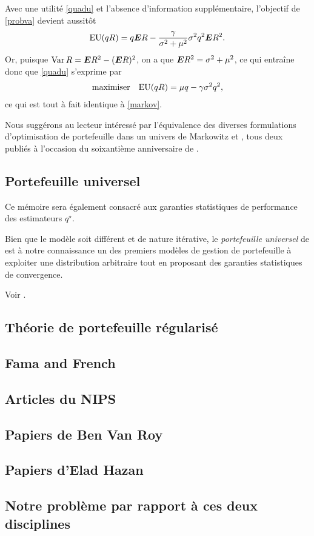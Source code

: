Avec une utilité \eqref{quadu} et l'absence d'information supplémentaire, l'objectif de
\eqref{probva} devient aussitôt
\begin{equation}
  \label{euquad}
  \operatorname{\bm{EU}}(qR) = q \bm E R - \frac{\gamma}{\sigma^2+\mu^2}\sigma^2 q^2\bm E R^2.
\end{equation}
Or, puisque $\operatorname{\bm{Var}} R = \bm E  R^2 - (\bm E R)^2$, on a que $\bm E R^2 = \sigma^2 + \mu^2$, ce qui entraîne
donc que \eqref{quadu} s'exprime par
\begin{equation}
  \begin{array}{ll}\operatorname*{maximiser} & \displaystyle{\operatorname{\bm{EU}}(qR) = \mu q - \gamma\sigma^2 q^2,}\end{array}
\end{equation}
ce qui est tout à fait identique à \eqref{markov}.

Nous suggérons au lecteur intéressé par l'équivalence des diverses formulations
d'optimi\-sation de portefeuille dans un univers de Markowitz \cite{bodnar2013equivalence}
et \cite{markowitz2014mean}, tous deux publiés à l'occasion du soixantième anniversaire de
\cite{markowitz1952portfolio}.

\subsection{Portefeuille universel}

Ce mémoire sera également consacré aux garanties statistiques de performance des
estimateurs $q^\star$.

Bien que le modèle soit différent et de nature itérative, le \textit{portefeuille
  universel} de \cite{cover1991universal} est à notre connaissance un des premiers modèles
de gestion de portefeuille à exploiter une distribution arbitraire tout en proposant des
garanties statistiques de convergence. 

Voir \cite{cover1991universal,hazan2015online}.


\subsection{Théorie de portefeuille régularisé}

\cite{ban2016machine}

\subsection{Fama and French}

\cite{fama1993common}


\subsection{Articles du NIPS}

\subsection{Papiers de Ben Van Roy}

\subsection{Papiers d'Elad Hazan}

\subsection{Notre problème par rapport à ces deux disciplines}




